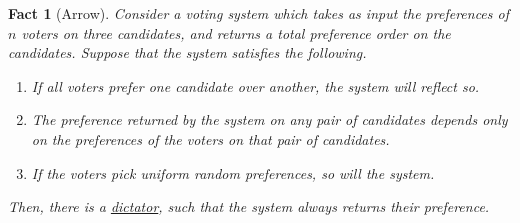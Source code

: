 \documentclass[12pt]{article}
\newtheorem*{fact*}{Fact}
\begin{document}
\begin{fact*}[Arrow]
Consider a voting system which takes as input the preferences of $n$ voters on three candidates, and returns a total preference order on the candidates. Suppose that the system satisfies the following.
\begin{enumerate}
    \item If all voters prefer one candidate over another, the system will reflect so.
    \item The preference returned by the system on any pair of candidates depends only on the preferences of the voters on that pair of candidates.
    \item If the voters pick uniform random preferences, so will the system.
\end{enumerate}
Then, there is a \underline{dictator}, such that the system always returns their preference.
\end{fact*}
\end{document}
